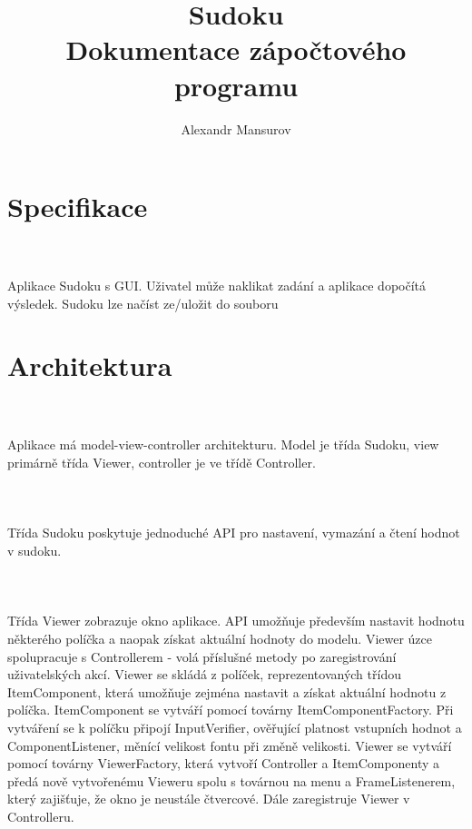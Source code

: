 \documentclass[10pt]{article}
\begin{document}
\title{Sudoku\\Dokumentace z\'apo\v{c}tov\'eho programu}
\author{Alexandr Mansurov}
\maketitle
\section{Specifikace}
\paragraph{~}Aplikace Sudoku s GUI. Uživatel může naklikat zadání a aplikace dopočítá výsledek. Sudoku lze načíst ze/uložit do souboru
\section{Architektura}
\paragraph{~}Aplikace m\'a model-view-controller architekturu. Model je t\v{r}\'ida Sudoku, view prim\'arn\v{e} t\v{r}\'ida Viewer, controller je ve t\v{r}\'id\v{e} Controller.
\paragraph{~}T\v{r}\'ida Sudoku poskytuje jednoduch\'e API pro nastaven\'i, vymaz\'an\'i a \v{c}ten\'i hodnot v sudoku.
\paragraph{~}T\v{r}\'ida Viewer zobrazuje okno aplikace. API umo\v{z}\v{n}uje p\v{r}edev\v{s}\'im nastavit hodnotu n\v{e}kter\'eho pol\'i\v{c}ka a naopak z\'iskat aktu\'aln\'i hodnoty do modelu. Viewer \'uzce spolupracuje s Controllerem - vol\'a p\v{r}\'islu\v{s}n\'e metody po zaregistrov\'an\'i u\v{z}ivatelsk\'ych akc\'i. Viewer se skl\'ad\'a z pol\'i\v{c}ek, reprezentovan\'ych t\v{r}\'idou ItemComponent, kter\'a umo\v{z}\v{n}uje zejm\'ena nastavit a z\'iskat aktu\'aln\'i hodnotu z pol\'i\v{c}ka. ItemComponent se vytv\'a\v{r}\'i pomoc\'i tov\'arny ItemComponentFactory. P\v{r}i vytv\'a\v{r}en\'i se k pol\'i\v{c}ku p\v{r}ipoj\'i InputVerifier, ov\v{e}\v{r}uj\'ic\'i platnost vstupn\'ich hodnot a ComponentListener, m\v{e}n\'ic\'i velikost fontu p\v{r}i zm\v{e}n\v{e} velikosti. Viewer se vytv\'a\v{r}\'i pomoc\'i tov\'arny ViewerFactory, kter\'a vytvo\v{r}\'i Controller a ItemComponenty a p\v{r}ed\'a nov\v{e} vytvo\v{r}en\'emu Vieweru spolu s tov\'arnou na menu a FrameListenerem, kter\'y zaji\v{s}\v{t}uje, \v{z}e okno je neust\'ale \v{c}tvercov\'e. D\'ale zaregistruje Viewer v Controlleru.
\end{document}
